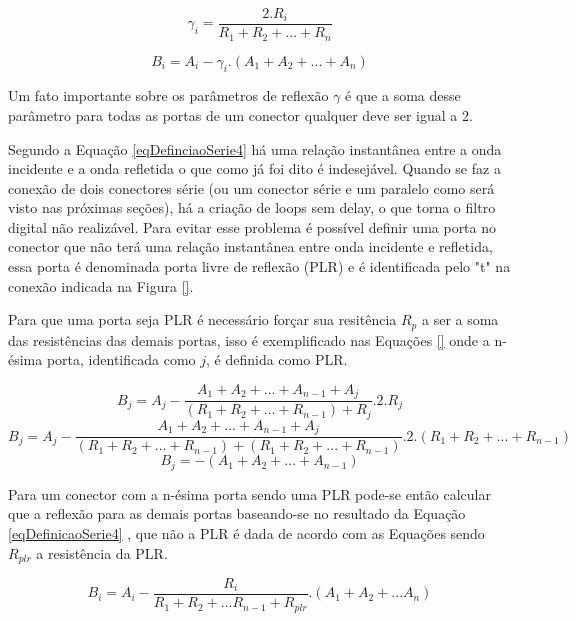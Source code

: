 	\begin{equation}
		\gamma_i = \frac{2.R_i}{R_1+R_2+...+R_n}
	\end{equation}
	
	\begin{equation}
		B_i = A_i -\gamma_i.(A_1+A_2+...+A_n)
	\end{equation}
	
	Um fato importante sobre os parâmetros de reflexão $\gamma$ é que a soma desse parâmetro para todas as portas de um conector qualquer deve ser igual a 2.
	
	Segundo a Equação \ref{eqDefinciaoSerie4} há uma relação instantânea entre a onda incidente e a onda refletida o que como já foi dito é indesejável. Quando se faz a conexão de dois conectores série (ou um conector série e um paralelo como será visto nas próximas seções), há a criação de loops sem delay, o que torna o filtro digital não realizável. Para evitar esse problema é possível definir uma porta no conector que não terá uma relação instantânea entre onda incidente e refletida, essa porta é denominada porta livre de reflexão (PLR) e é identificada pelo "t" na conexão indicada na Figura \ref{}. 
	
	Para que uma porta seja PLR é necessário forçar sua resitência $R_p$ a ser a soma das resistências das demais portas, isso é exemplificado nas Equações \ref{} onde a n-ésima porta, identificada como $j$, é definida como PLR.
	
	\begin{equation}
		B_j = A_j -\frac{A_1+A_2+...+A_{n-1}+A_j}{(R_1+R_2+...+R_{n-1})+R_j}.2.R_j 
	\end{equation}  
	\begin{equation}
		B_j = A_j -\frac{A_1+A_2+...+A_{n-1}+A_j}{(R_1+R_2+...+R_{n-1})+(R_1+R_2+...+R_{n-1})}.2.(R_1+R_2+...+R_{n-1}) 
	\end{equation}
	\begin{equation}
		B_j = -(A_1+A_2+...+A_{n-1})
	\end{equation}
	
	Para um conector com a n-ésima porta sendo uma PLR pode-se então calcular que a reflexão para as demais portas baseando-se no resultado da Equação \ref{eqDefinicaoSerie4} , que não a PLR é dada de acordo com as Equações sendo $R_{plr}$ a resistência da PLR.
	
	\begin{equation}
		B_i = A_i - \frac{R_i}{R_1+R_2+...R_{n-1}+R_{plr}}.(A_1+A_2+...A_n)
	\end{equation}
	
